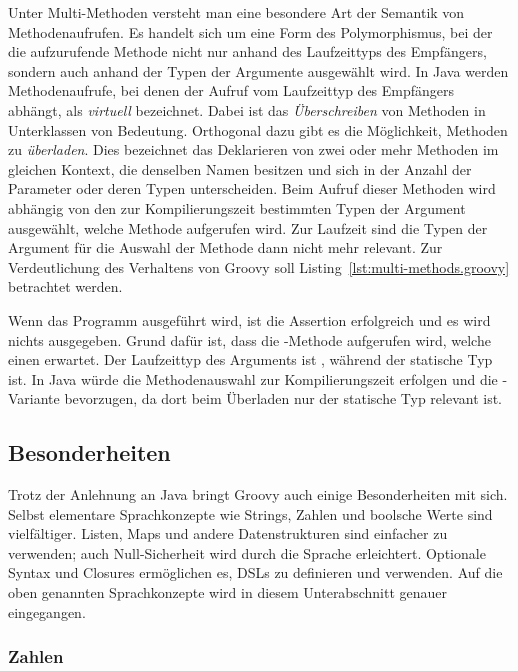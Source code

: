 Unter Multi-Methoden versteht man eine besondere Art der Semantik von Methodenaufrufen.
Es handelt sich um eine Form des Polymorphismus, bei der die aufzurufende Methode nicht nur anhand des Laufzeittyps des Empfängers, sondern auch anhand der Typen der Argumente ausgewählt wird.
In Java werden Methodenaufrufe, bei denen der Aufruf vom Laufzeittyp des Empfängers abhängt, als \emph{virtuell} bezeichnet.
Dabei ist das \emph{Überschreiben} von Methoden in Unterklassen von Bedeutung.
Orthogonal dazu gibt es die Möglichkeit, Methoden zu \emph{überladen}.
Dies bezeichnet das Deklarieren von zwei oder mehr Methoden im gleichen Kontext, die denselben Namen besitzen und sich in der Anzahl der Parameter oder deren Typen unterscheiden.
Beim Aufruf dieser Methoden wird abhängig von den zur Kompilierungszeit bestimmten Typen der Argument ausgewählt, welche Methode aufgerufen wird.
Zur Laufzeit sind die Typen der Argument für die Auswahl der Methode dann nicht mehr relevant.
Zur Verdeutlichung des Verhaltens von Groovy soll Listing~\ref{lst:multi-methods.groovy} betrachtet werden.


Wenn das Programm ausgeführt wird, ist die Assertion erfolgreich und es wird nichts ausgegeben.
Grund dafür ist, dass die -Methode aufgerufen wird, welche einen  erwartet.
Der Laufzeittyp des Arguments  ist , während der statische Typ  ist.
In Java würde die Methodenauswahl zur Kompilierungszeit erfolgen und die -Variante bevorzugen, da dort beim Überladen nur der statische Typ relevant ist.

\subsection{Besonderheiten}\label{subsec:besonderheiten}

Trotz der Anlehnung an Java bringt Groovy auch einige Besonderheiten mit sich.
Selbst elementare Sprachkonzepte wie Strings, Zahlen und boolsche Werte sind vielfältiger.
Listen, Maps und andere Datenstrukturen sind einfacher zu verwenden; auch Null-Sicherheit wird durch die Sprache erleichtert.
Optionale Syntax und Closures ermöglichen es, DSLs zu definieren und verwenden.
Auf die oben genannten Sprachkonzepte wird in diesem Unterabschnitt genauer eingegangen.

\subsubsection{Zahlen}\label{subsubsec:zahlen}

